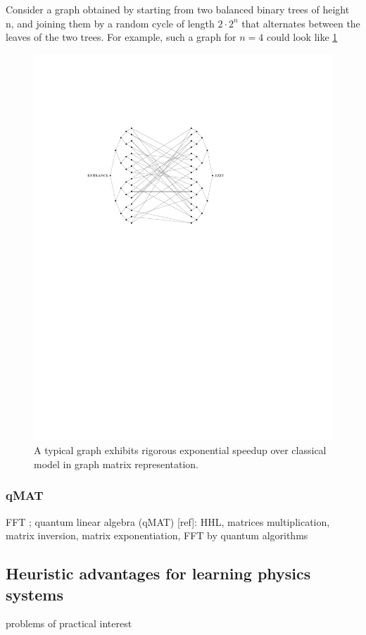 Consider a graph obtained by starting from two balanced binary trees of height n, and joining them by a random cycle of length $2\cdot 2^n$ that alternates between the leaves of the two trees. 
For example, such a graph for $n = 4$ could look like \cref{fig:glued_tree}
\begin{figure}[!ht]
	\centering
	\includegraphics[width=.6\linewidth]{glued_tree.pdf}
	\caption{A typical graph exhibits rigorous exponential speedup over classical model in graph matrix representation. \cite{childsExponentialAlgorithmicSpeedup2003}}
	\label{fig:glued_tree}
\end{figure}

\subsubsection{qMAT}
FFT
\cite{kondorGraphletSpectrum2009};
quantum linear algebra (qMAT) [ref]: HHL, matrices multiplication, matrix inversion, matrix exponentiation, FFT by quantum algorithms
\cite{sornsaengQuantumDiffusionMap2021}

\subsection{Heuristic advantages for learning physics systems}
problems of practical interest

